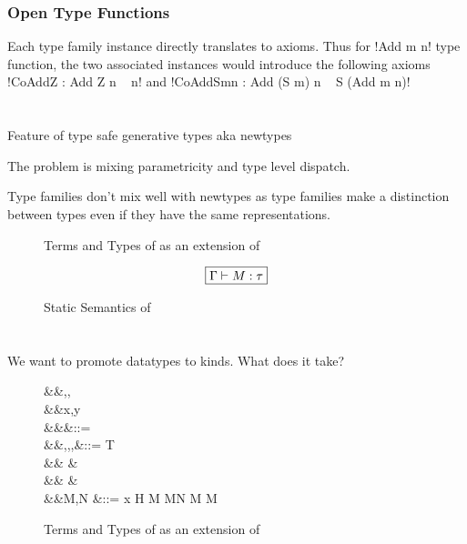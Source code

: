 \documentclass[manuscript,screen,nonacm]{acmart}
\begin{document}
\subsubsection{Open Type Functions}
Each type family instance directly translates to axioms. Thus for !Add m n! type function, the two associated instances would introduce the following axioms !CoAddZ : Add Z n ~ n! and !CoAddSmn : Add (S m) n ~ S (Add m n)!


\section{\SFR}\label{sec:sfr} %

Feature of type safe generative types aka newtypes

The problem is mixing parametricity and type level dispatch.

Type families don't mix well with newtypes as type families make a distinction between types
even if they have the same representations.


\begin{figure}[ht]
  \caption{Terms and Types of \SFR as an extension of \SFC}
  \label{fig:system-fcr-syntax}
\end{figure}

\begin{figure}[ht]
  \centering
  \begin{gather*}
    \fbox{$\Gamma \vdash M : \tau$}
  \end{gather*}
  \caption{Static Semantics of \SFR}
  \label{fig:sfr-typing}
\end{figure}




\section{\SFP}\label{sec:sfp} %
We want to promote datatypes to kinds. What does it take?
\begin{figure}[ht]
  \centering
  \begin{syntax}
     &&\alpha,\beta,\gamma \\
     &&x,y          \\
         &&\kappa                  &::= \star \bnfor \kappa \to \kappa \bnfor \syntaxhl{\tau \sim \sigma}\\
         &&\tau,\sigma,\gamma,\nu  &::= \alpha \bnfor T \bnfor {} \bnfor \tau \to \tau \bnfor \Forall {\alpha\co\kappa} \tau\\
    &&                        &\syntaxhl{\bnfor \sym \Co \bnfor \trans \nu \Co \bnfor \Co\At\tau \bnfor \Left \Co \bnfor \Right \Co} \\
    &&                        &\syntaxhl{\bnfor  \Cast \Co \Co}\\
         &&M,N                     &::= x \bnfor H \bnfor {} M \bnfor M\App N \bnfor \TLam{\tau\co\kappa} M \bnfor M\App \tau
  \end{syntax}
  \caption{Terms and Types of \SFP as an extension of \SFC}
  \label{fig:system-fcp-syntax}
\end{figure}
\end{document}
